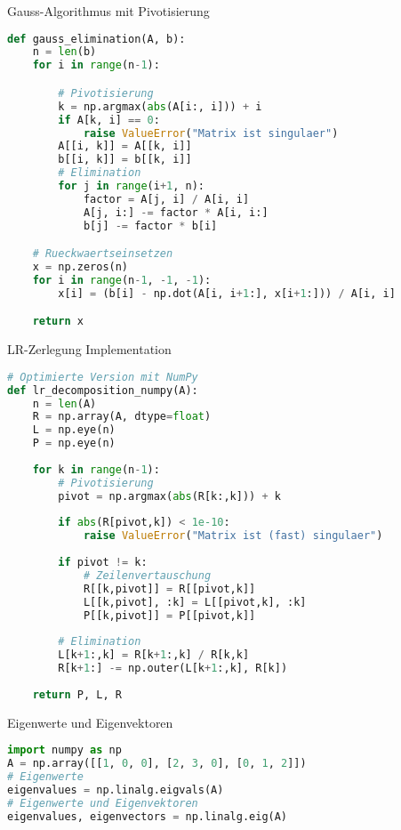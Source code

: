 \begin{examplecode}{Gauss-Algorithmus mit Pivotisierung}
\begin{lstlisting}[language=Python, style=basesmol]
def gauss_elimination(A, b):
    n = len(b)
    for i in range(n-1):

        # Pivotisierung
        k = np.argmax(abs(A[i:, i])) + i
        if A[k, i] == 0:
            raise ValueError("Matrix ist singulaer")
        A[[i, k]] = A[[k, i]]
        b[[i, k]] = b[[k, i]]
        # Elimination
        for j in range(i+1, n):
            factor = A[j, i] / A[i, i]
            A[j, i:] -= factor * A[i, i:]
            b[j] -= factor * b[i]

    # Rueckwaertseinsetzen
    x = np.zeros(n)
    for i in range(n-1, -1, -1):
        x[i] = (b[i] - np.dot(A[i, i+1:], x[i+1:])) / A[i, i]

    return x
\end{lstlisting}
\end{examplecode}

\begin{examplecode}{LR-Zerlegung Implementation}
\begin{lstlisting}[language=Python, style=basesmol]
# Optimierte Version mit NumPy
def lr_decomposition_numpy(A):
    n = len(A)
    R = np.array(A, dtype=float)
    L = np.eye(n)
    P = np.eye(n)
    
    for k in range(n-1):
        # Pivotisierung
        pivot = np.argmax(abs(R[k:,k])) + k
        
        if abs(R[pivot,k]) < 1e-10:
            raise ValueError("Matrix ist (fast) singulaer")
            
        if pivot != k:
            # Zeilenvertauschung
            R[[k,pivot]] = R[[pivot,k]]
            L[[k,pivot], :k] = L[[pivot,k], :k]
            P[[k,pivot]] = P[[pivot,k]]
            
        # Elimination
        L[k+1:,k] = R[k+1:,k] / R[k,k]
        R[k+1:] -= np.outer(L[k+1:,k], R[k])
        
    return P, L, R
\end{lstlisting}
\end{examplecode}

\begin{examplecode}{Eigenwerte und Eigenvektoren}
\begin{lstlisting}[language=Python, style=basesmol]
import numpy as np
A = np.array([[1, 0, 0], [2, 3, 0], [0, 1, 2]])
# Eigenwerte
eigenvalues = np.linalg.eigvals(A)
# Eigenwerte und Eigenvektoren
eigenvalues, eigenvectors = np.linalg.eig(A)
\end{lstlisting}
\end{examplecode}

